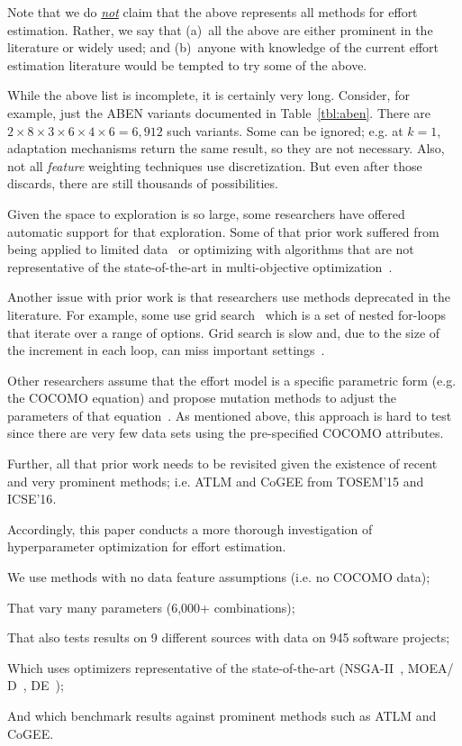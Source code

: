 Note that we do \underline{{\em not}} claim that the above represents all methods for  effort estimation. Rather, we  say that (a)~all the above are either prominent in the literature or widely used; and (b)~anyone  with knowledge of  the current effort estimation 
literature would be tempted to try some of the above.

While the above list is incomplete, it is certainly very long. Consider, for example, just the ABEN
variants documented in Table~\ref{tbl:aben}. There are 
$2\times 8\times 3\times 6\times 4\times 6=6,912$ such variants.  Some   can be ignored;
e.g. at $k=1$,     adaptation mechanisms return the same result, so they are not necessary. Also, not all  {\em feature} weighting techniques use discretization. But even after those discards, there are still thousands of possibilities. 

Given the space to exploration is so large, some researchers have offered automatic support for that exploration.
Some of that prior work suffered from being applied to limited data~\cite{li09} or optimizing
with algorithms that are not representative of  the state-of-the-art in multi-objective optimization~\cite{li09}.

Another issue with prior work is that researchers use methods  deprecated in the literature. 
For example,  some use grid search~\cite{dejaeger12,Song:2013}  which is a set of
nested for-loops that iterate over  a range of options.
Grid search is  slow and, due to the size of the increment in each loop, can miss important settings~\cite{Bergstra:2012}.

Other researchers assume that the effort model is a specific parametric form (e.g. the COCOMO equation)
and propose mutation methods to adjust the parameters of that equation~\cite{aljahdali2010software,Moeyersoms:2015,singh2012software,IJST70010,Rao14}. As mentioned above, this approach is
hard to test since there are very few data sets using the   pre-specified COCOMO attributes. 

Further, all that prior work needs to be revisited given the existence of recent and very prominent
methods; i.e. ATLM and CoGEE from TOSEM'15 and ICSE'16\cite{Whigham:2015,sarro2016multi}.


Accordingly, this paper conducts a  more thorough investigation of   hyperparameter optimization for effort estimation. 
\bi
\item
We  use methods with no   data
feature assumptions (i.e. no COCOMO data);
\item
That
 vary
many   parameters (6,000+ combinations);
\item
That also  tests  results   on 9 different sources with data on 945 software projects; 
\item
Which  uses optimizers   representative of the  state-of-the-art 
(NSGA-II~\cite{deb02}, MOEA/ D~\cite{Zhang07}, DE~\cite{storn1997differential});
\item
And which 
benchmark results 
against  prominent methods such as 
  ATLM and CoGEE.
\ei


